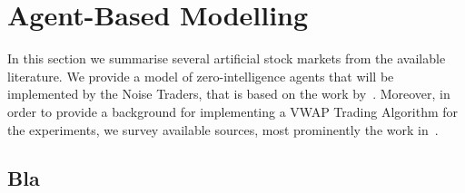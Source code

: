 \section{Agent-Based Modelling}
\label{Chapters/Background/Agent-Based-Modelling}

In this section we summarise several artificial stock markets from the available literature. We provide a model of zero-intelligence agents that will be implemented by the Noise Traders, that is based on the work by~\citet[chap.~4]{Gilles2006}. Moreover, in order to provide a background for implementing a VWAP Trading Algorithm for the experiments, we survey available sources, most prominently the work in~\cite{Coggins2006, Kakade2004}. 

\subsection{Bla}


